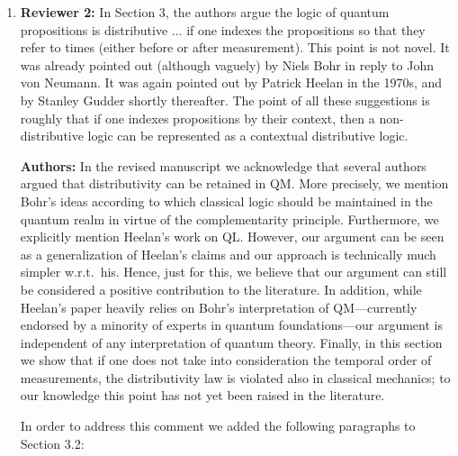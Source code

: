 \documentclass[11pt, executivepaper]{article}
\begin{document}
\begin{enumerate}
\item \textbf{Reviewer 2:} In Section 3, the authors argue the logic of quantum propositions is distributive ... if one indexes the propositions so that they refer to times (either before or after measurement). This point is not novel. It was already pointed out (although vaguely) by Niels Bohr in reply to John von Neumann. It was again pointed out by Patrick Heelan in the 1970s, and by Stanley Gudder shortly thereafter. The point of all these suggestions is roughly that if one indexes propositions by their context, then a non-distributive logic can be represented as a contextual distributive logic.
\vspace{2mm}

\textbf{Authors:} In the revised manuscript we acknowledge that several authors argued that distributivity can be retained in QM. More precisely, we mention Bohr's ideas according to which classical logic should be maintained in the quantum realm in virtue of the complementarity principle. Furthermore, we explicitly mention Heelan's work on QL. However, our argument can be seen as a generalization of Heelan's claims and our approach is technically much simpler w.r.t.\ his. Hence, just for this, we believe that our argument can still be considered a positive contribution to the literature. In addition, while Heelan's paper heavily relies on Bohr's interpretation of QM---currently endorsed by a minority of experts in quantum foundations---our argument is independent of any interpretation of quantum theory. Finally, in this section we show that if one does not take into consideration the temporal order of measurements, the distributivity law is violated also in classical mechanics; to our knowledge this point has not yet been raised in the literature.

In order to address this comment we added the following paragraphs to Section 3.2:


\end{enumerate}
\end{document}
